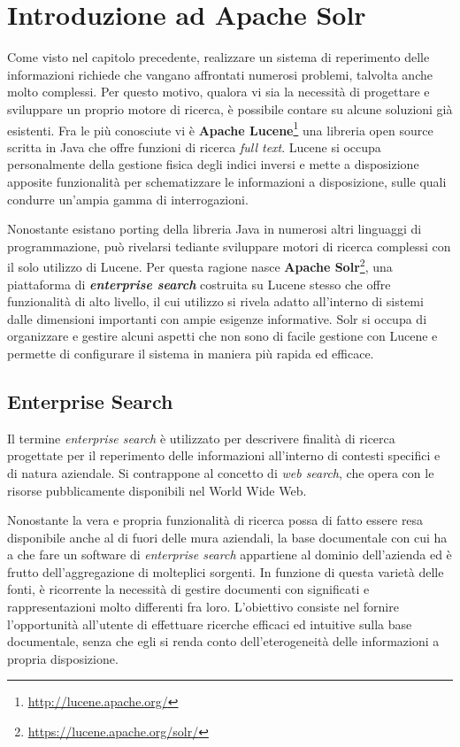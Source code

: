 \chapter{Introduzione ad Apache Solr}

Come visto nel capitolo precedente, realizzare un sistema di reperimento delle informazioni richiede che vangano affrontati numerosi problemi, talvolta anche molto complessi. Per questo motivo, qualora vi sia la necessità di progettare e sviluppare un proprio motore di ricerca, è possibile contare su alcune soluzioni già esistenti. Fra le più conosciute vi è \textbf{Apache Lucene}\footnote{\url{http://lucene.apache.org/}} una libreria open source scritta in Java che offre funzioni di ricerca \textit{full text}. Lucene si occupa personalmente della gestione fisica degli indici inversi e mette a disposizione apposite funzionalità per schematizzare le informazioni a disposizione, sulle quali condurre un’ampia gamma di interrogazioni.

Nonostante esistano porting della libreria Java in numerosi altri linguaggi di programmazione, può rivelarsi tediante sviluppare motori di ricerca complessi con il solo utilizzo di Lucene. Per questa ragione nasce \textbf{Apache Solr}\footnote{\url{https://lucene.apache.org/solr/}}, una piattaforma di \textbf{\textit{enterprise search}} costruita su Lucene stesso che offre funzionalità di alto livello, il cui utilizzo si rivela adatto all’interno di sistemi dalle dimensioni importanti con ampie esigenze informative. Solr si occupa di organizzare e gestire alcuni aspetti che non sono di facile gestione con Lucene e permette di configurare il sistema in maniera più rapida ed efficace.




\section{Enterprise Search}

Il termine \textit{enterprise search} è utilizzato per descrivere finalità di ricerca progettate per il reperimento delle informazioni all’interno di contesti specifici e di natura aziendale. Si contrappone al concetto di \textit{web search}, che opera con le risorse pubblicamente disponibili nel World Wide Web.

Nonostante la vera e propria funzionalità di ricerca possa di fatto essere resa disponibile anche al di fuori delle mura aziendali, la base documentale con cui ha a che fare un software di \textit{enterprise search} appartiene al dominio dell’azienda ed è frutto dell’aggregazione di molteplici sorgenti. In funzione di questa varietà delle fonti, è ricorrente la necessità di gestire documenti con significati e rappresentazioni molto differenti fra loro. L’obiettivo consiste nel fornire l’opportunità all’utente di effettuare ricerche efficaci ed intuitive sulla base documentale, senza che egli si renda conto dell’eterogeneità delle informazioni a propria disposizione.

